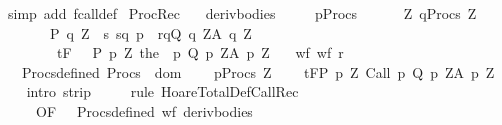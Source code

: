 \begin{isabellebody}
\isamarkupfalse%
\ {\isacharparenleft}simp\ add{\isacharcolon}\ fcall{\isacharunderscore}def{\isacharparenright}%
\endisatagproof
{\isafoldproof}%
%
\isadelimproof
\isanewline
%
\endisadelimproof
\isanewline
{}\isamarkupfalse%
\ ProcRec{\isacharcolon}\isanewline
\ \ \ deriv{\isacharunderscore}bodies{\isacharcolon}\ \ \isanewline
\ \ \ {\isachardoublequoteopen}{\isasymforall}p{\isasymin}Procs{\isachardot}\ \isanewline
\ \ \ \ {\isasymforall}{\isasymsigma}\ Z{\isachardot}\ {\isasymGamma}{\isacharcomma}{\isasymTheta}{\isasymunion}{\isacharparenleft}{\isasymUnion}q{\isasymin}Procs{\isachardot}\ {\isasymUnion}Z{\isachardot}\ \isanewline
\ \ \ \ \ \ \ {\isacharbraceleft}{\isacharparenleft}P\ q\ Z\ {\isasyminter}\ {\isacharbraceleft}s{\isachardot}\ {\isacharparenleft}{\isacharparenleft}s{\isacharcomma}q{\isacharparenright}{\isacharcomma}\ {\isasymsigma}{\isacharcomma}p{\isacharparenright}\ {\isasymin}\ r{\isacharbraceright}{\isacharcomma}q{\isacharcomma}Q\ q\ Z{\isacharcomma}A\ q\ Z{\isacharparenright}{\isacharbraceright}{\isacharparenright}\isanewline
\ \ \ \ \ \ \ \ {\isasymturnstile}\isactrlsub t\isactrlbsub {\isacharslash}F\isactrlesub \ {\isacharparenleft}{\isacharbraceleft}{\isasymsigma}{\isacharbraceright}\ {\isasyminter}\ P\ p\ Z{\isacharparenright}\ {\isacharparenleft}the\ {\isacharparenleft}{\isasymGamma}\ p{\isacharparenright}{\isacharparenright}\ {\isacharparenleft}Q\ p\ Z{\isacharparenright}{\isacharcomma}{\isacharparenleft}A\ p\ Z{\isacharparenright}{\isachardoublequoteclose}\isanewline
\ \ \ wf{\isacharcolon}\ {\isachardoublequoteopen}wf\ r{\isachardoublequoteclose}\isanewline
\ \ \ Procs{\isacharunderscore}defined{\isacharcolon}\ {\isachardoublequoteopen}Procs\ {\isasymsubseteq}\ dom\ {\isasymGamma}{\isachardoublequoteclose}\isanewline
\ \ \ {\isachardoublequoteopen}{\isasymforall}p{\isasymin}Procs{\isachardot}\ {\isasymforall}Z{\isachardot}\ \ \isanewline
\ \ {\isasymGamma}{\isacharcomma}{\isasymTheta}{\isasymturnstile}\isactrlsub t\isactrlbsub {\isacharslash}F\isactrlesub {\isacharparenleft}P\ p\ Z{\isacharparenright}\ Call\ p\ {\isacharparenleft}Q\ p\ Z{\isacharparenright}{\isacharcomma}{\isacharparenleft}A\ p\ Z{\isacharparenright}{\isachardoublequoteclose}\isanewline
%
\isadelimproof
\ \ %
\endisadelimproof
%
\isatagproof
{}\isamarkupfalse%
\ {\isacharparenleft}intro\ strip{\isacharparenright}\isanewline
\ \ \ \ \ {\isacharparenleft}rule\ HoareTotalDef{\isachardot}CallRec{\isacharprime}\ \isanewline
\ \ \ \ \ {\isacharbrackleft}OF\ {\isacharunderscore}\ \ Procs{\isacharunderscore}defined\ wf\ deriv{\isacharunderscore}bodies{\isacharbrackright}{\isacharcomma}\isanewline

\end{isabellebody}

